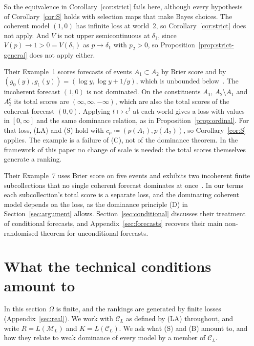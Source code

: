 \documentclass[11pt]{article}
\theoremstyle{definition}
\theoremstyle{remark}
\newcommand{\M}{\mathcal M}
\newcommand{\C}{\mathcal C}
\begin{document}
So the equivalence in Corollary~\ref{cor:strict} fails here, although every hypothesis of Corollary~\ref{cor:S} holds with selection maps that make Bayes choices. The coherent model $(1,0)$ has infinite loss at world~$2$, so Corollary~\ref{cor:strict} does not apply. And $V$ is not upper semicontinuous at $\delta_1$, since $V(p)\to1>0=V(\delta_1)$ as $p\to\delta_1$ with $p_2>0$, so Proposition~\ref{prop:strict-general} does not apply either.

Their Example~1 scores forecasts of events $A_1\subset A_2$ by Brier score and by $(g_0(y),g_1(y))=(\log y,\log y+1/y)$, which is unbounded below~\cite[Example~1]{SSK09}. The incoherent forecast $(1,0)$ is not dominated. On the constituents $A_1$, $A_2\setminus A_1$ and $A_2^c$ its total scores are $(\infty,\infty,-\infty)$, which are also the total scores of the coherent forecast $(0,0)$. Applying $t\mapsto e^t$ at each world gives a loss with values in $[0,\infty]$ and the same dominance relation, as in Proposition~\ref{prop:ordinal}. For that loss, (LA) and (S) hold with $c_p\coloneqq (p(A_1),p(A_2))$, so Corollary~\ref{cor:S} applies. The example is a failure of (C), not of the dominance theorem. In the framework of this paper no change of scale is needed: the total scores themselves generate a ranking.

Their Example~7 uses Brier score on five events and exhibits two incoherent finite subcollections that no single coherent forecast dominates at once~\cite[Example~7]{SSK09}. In our terms each subcollection's total score is a separate loss, and the dominating coherent model depends on the loss, as the dominance principle (D) in Section~\ref{sec:argument} allows. Section~\ref{sec:conditional} discusses their treatment of conditional forecasts, and Appendix~\ref{sec:forecasts} recovers their main non-randomised theorem for unconditional forecasts.


\section{What the technical conditions amount to}\label{sec:finite}
In this section $\Omega$ is finite, and the rankings are generated by finite losses (Appendix~\ref{sec:real}). We work with $\C_L$ as defined by (LA) throughout, and write $R=L(\M_L)$ and $K=L(\C_L)$. We ask what (S) and (B) amount to, and how they relate to weak dominance of every model by a member of $\C_L$.
\end{document}
